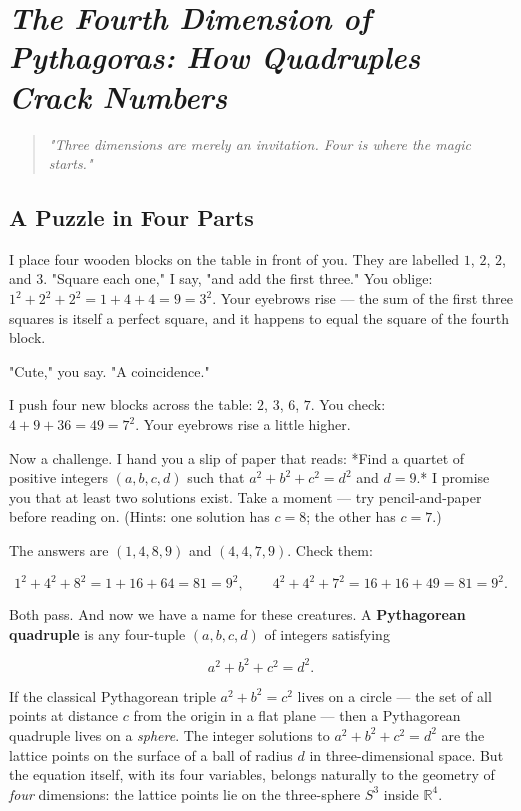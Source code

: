 \chapter{\textit{The Fourth Dimension of Pythagoras: How Quadruples Crack Numbers}}
\label{ch12}



\bigskip


\begin{quote}
\itshape \textit{"Three dimensions are merely an invitation. Four is where the magic starts."}
\end{quote}


\bigskip


\section{A Puzzle in Four Parts}

I place four wooden blocks on the table in front of you. They are labelled $1$, $2$, $2$, and $3$. "Square each one," I say, "and add the first three." You oblige: $1^2 + 2^2 + 2^2 = 1 + 4 + 4 = 9 = 3^2$. Your eyebrows rise --- the sum of the first three squares is itself a perfect square, and it happens to equal the square of the fourth block.

"Cute," you say. "A coincidence."

I push four new blocks across the table: $2$, $3$, $6$, $7$. You check: $4 + 9 + 36 = 49 = 7^2$. Your eyebrows rise a little higher.

Now a challenge. I hand you a slip of paper that reads: *Find a quartet of positive integers $(a, b, c, d)$ such that $a^2 + b^2 + c^2 = d^2$ and $d = 9$.* I promise you that at least two solutions exist. Take a moment --- try pencil-and-paper before reading on. (Hints: one solution has $c = 8$; the other has $c = 7$.)

The answers are $(1, 4, 8, 9)$ and $(4, 4, 7, 9)$. Check them:

\[
1^2 + 4^2 + 8^2 = 1 + 16 + 64 = 81 = 9^2, \qquad 4^2 + 4^2 + 7^2 = 16 + 16 + 49 = 81 = 9^2.
\]

Both pass. And now we have a name for these creatures. A \textbf{Pythagorean quadruple} is any four-tuple $(a, b, c, d)$ of integers satisfying

\[
a^2 + b^2 + c^2 = d^2.
\]

If the classical Pythagorean triple $a^2 + b^2 = c^2$ lives on a circle --- the set of all points at distance $c$ from the origin in a flat plane --- then a Pythagorean quadruple lives on a \textit{sphere}. The integer solutions to $a^2 + b^2 + c^2 = d^2$ are the lattice points on the surface of a ball of radius $d$ in three-dimensional space. But the equation itself, with its four variables, belongs naturally to the geometry of \textit{four} dimensions: the lattice points lie on the three-sphere $S^3$ inside $\mathbb{R}^4$.

